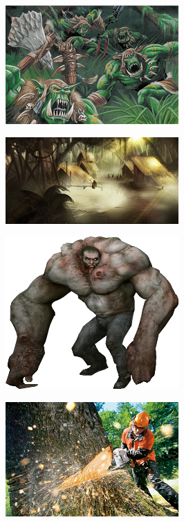 \begin{figure}
	\begin{center}
		\includegraphics[width=\figwidth]{pics/6/31.png}
	\end{center}
\end{figure}

\begin{figure}
	\begin{center}
		\includegraphics[width=\figwidth]{pics/6/32.png}
	\end{center}
\end{figure}

\begin{figure}
	\begin{center}
		\includegraphics[width=\figwidth]{pics/6/33.png}
	\end{center}
\end{figure}

\begin{figure}
	\begin{center}
		\includegraphics[width=\figwidth]{pics/6/34.png}
	\end{center}
\end{figure}

